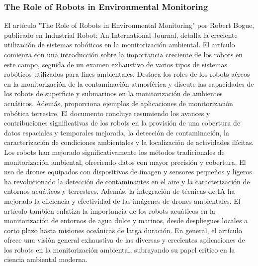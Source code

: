 \subsubsection{The Role of Robots in Environmental Monitoring} %
\label{ssub:EN}
    El art\'iculo "The Role of Robots in Environmental Monitoring" por Robert Bogue, publicado en Industrial Robot:
        An International Journal, detalla la creciente utilizaci\'on de sistemas rob\'oticos en la monitorizaci\'on ambiental. 
        El art\'iculo comienza con una introducci\'on sobre la importancia creciente de los robots en este campo, seguida de 
        un examen exhaustivo de varios tipos de sistemas rob\'oticos utilizados para fines ambientales. Destaca los roles 
        de los robots a\'ereos en la monitorizaci\'on de la contaminaci\'on atmosf\'erica y discute las capacidades de los 
        robots de superficie y submarinos en la monitorizaci\'on de ambientes acu\'aticos. Adem\'as, proporciona ejemplos 
        de aplicaciones de monitorizaci\'on rob\'otica terrestre. El documento concluye resumiendo los avances y 
        contribuciones significativas de los robots en la provisi\'on de una cobertura de datos espaciales y 
        temporales mejorada, la detecci\'on de contaminaci\'on, la caracterizaci\'on de condiciones ambientales y 
        la localizaci\'on de actividades il\'icitas.
    \vskip 0.5cm
    Los robots han mejorado significativamente los m\'etodos tradicionales de monitorizaci\'on ambiental, 
        ofreciendo datos con mayor precisi\'on y cobertura. El uso de drones equipados con dispositivos 
        de imagen y sensores peque\~nos y ligeros ha revolucionado la detecci\'on de contaminantes en el 
        aire y la caracterizaci\'on de entornos acu\'aticos y terrestres. Adem\'as, la integraci\'on de t\'ecnicas 
        de IA ha mejorado la eficiencia y efectividad de las im\'agenes de drones ambientales. El art\'iculo 
        tambi\'en enfatiza la importancia de los robots acu\'aticos en la monitorizaci\'on de entornos de agua 
        dulce y marinos, desde despliegues locales a corto plazo hasta misiones oce\'anicas de larga duraci\'on.
        En general, el art\'iculo ofrece una visi\'on general exhaustiva de las diversas y crecientes aplicaciones 
        de los robots en la monitorizaci\'on ambiental, subrayando su papel cr\'itico en la ciencia ambiental moderna. \cite{Bogue2020}

